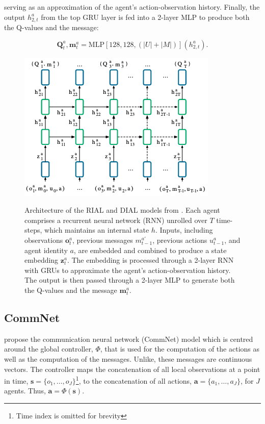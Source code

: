 \documentclass{article}
\begin{document}
serving as an approximation of the agent’s action-observation history. Finally, the output \( h_{2, t}^a \) from the top GRU layer is fed into a 2-layer MLP to produce both the Q-values and the message:

$$
\mathbf{Q}_t^a, \mathbf{m}_t^a = \text{MLP}[128, 128, (|U| + |M|)](h_{2, t}^a).
$$


\begin{figure}
	\centering
	\includegraphics[scale=0.7]{images/rial_dial_nn.png}\
	\caption{Architecture of the RIAL and DIAL models from \citet{foerster2016learning}. Each agent comprises a recurrent neural network (RNN) unrolled over \( T \) time-steps, which maintains an internal state \( h \). Inputs, including observations \( \mathbf{o}_t^a \), previous messages \( m_{t-1}^{a'} \), previous actions \( u_{t-1}^a \), and agent identity \( a \), are embedded and combined to produce a state embedding \( \mathbf{z}_t^a \). The embedding is processed through a 2-layer RNN with GRUs to approximate the agent’s action-observation history. The output is then passed through a 2-layer MLP to generate both the Q-values and the message \( \mathbf{m}_t^a \).}
	\label{fig:rial_dial_nn}
\end{figure}

\subsection{CommNet}

\citet{sukhbaatar2016commnet} propose the communication neural network (CommNet) model which is centred around the global controller, $\Phi$, that is used for the computation of the actions as well as the computation of the messages. Unlike, \citet{foerster2016learning} these messages are continuous vectors. The controller maps the concatenation of all local observations at a point in time, $\mathbf{s} = \{ o_1, \hdots, o_J \}$\footnote{Time index is omitted for brevity}, to the concatenation of all actions, $\mathbf{a} = \{ a_1, \hdots, a_J \}$, for $J$ agents. Thus, $\mathbf{a} = \Phi(\mathbf{s})$. 
\end{document}
